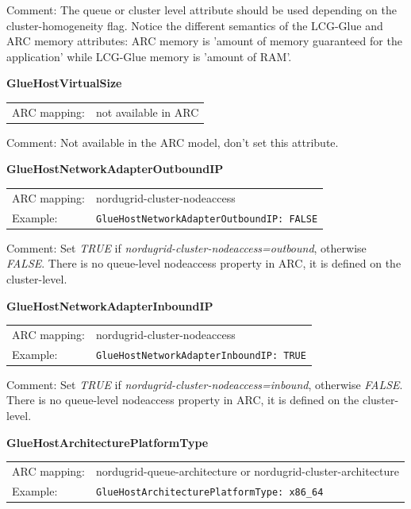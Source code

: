 \documentclass{article}
\begin{document}
Comment: The queue or cluster level attribute should be used depending on the 
cluster-homogeneity flag. Notice the different semantics of the 
LCG-Glue and ARC memory attributes:
ARC memory is 'amount of memory guaranteed for the application' while 
LCG-Glue memory  is 'amount of RAM'.


\hspace*{0.5cm}
\begin{shaded}
 \textbf{GlueHostVirtualSize} 
\end{shaded}
\begin{tabular}{lp{10cm}}  
  ARC mapping:& not available in ARC\\ 
\end{tabular}

Comment: Not available in the ARC model, don't set this attribute.

 
\hspace*{0.5cm}
\begin{shaded}
 \textbf{GlueHostNetworkAdapterOutboundIP} 
\end{shaded}
\begin{tabular}{lp{10cm}}  
  ARC mapping:& nordugrid-cluster-nodeaccess\\
  Example:& \verb#GlueHostNetworkAdapterOutboundIP: FALSE#\\
\end{tabular}

Comment: Set {\it TRUE} if 
{\it nordugrid-cluster-nodeaccess=outbound}, otherwise {\it FALSE}.
There is no queue-level nodeaccess property in ARC, 
it is defined on the cluster-level. 

 
\hspace*{0.5cm}
\begin{shaded}
 \textbf{GlueHostNetworkAdapterInboundIP} 
\end{shaded}
\begin{tabular}{lp{10cm}}  
  ARC mapping:& nordugrid-cluster-nodeaccess\\
  Example:& \verb#GlueHostNetworkAdapterInboundIP: TRUE#\\
\end{tabular}

Comment: Set {\it TRUE} if {\it nordugrid-cluster-nodeaccess=inbound}, 
otherwise {\it FALSE}. There is no queue-level nodeaccess property in ARC, 
it is defined on the cluster-level.
 
 
\hspace*{0.5cm}
\begin{shaded}
 \textbf{GlueHostArchitecturePlatformType} 
\end{shaded}
\begin{tabular}{lp{10cm}}  
  ARC mapping:& nordugrid-queue-architecture or nordugrid-cluster-architecture\\
  Example:& \verb#GlueHostArchitecturePlatformType: x86_64#\\
\end{tabular}
\end{document}
